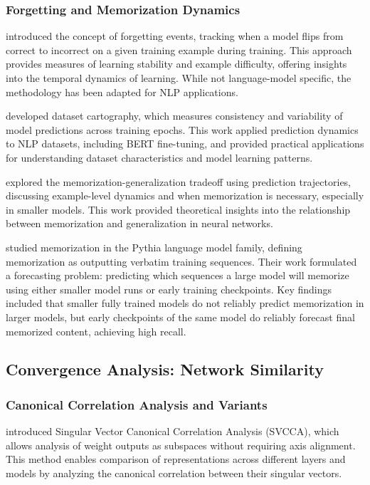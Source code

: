 \subsubsection{Forgetting and Memorization Dynamics}

\citet{toneva2019empirical} introduced the concept of forgetting events, tracking when a model flips from correct to incorrect on a given training example during training. This approach provides measures of learning stability and example difficulty, offering insights into the temporal dynamics of learning. While not language-model specific, the methodology has been adapted for NLP applications.

\citet{swayamdipta2020dataset} developed dataset cartography, which measures consistency and variability of model predictions across training epochs. This work applied prediction dynamics to NLP datasets, including BERT fine-tuning, and provided practical applications for understanding dataset characteristics and model learning patterns.

\citet{feldman2020does} explored the memorization-generalization tradeoff using prediction trajectories, discussing example-level dynamics and when memorization is necessary, especially in smaller models. This work provided theoretical insights into the relationship between memorization and generalization in neural networks.

\citet{biderman2023emergent} studied memorization in the Pythia language model family, defining memorization as outputting verbatim training sequences. Their work formulated a forecasting problem: predicting which sequences a large model will memorize using either smaller model runs or early training checkpoints. Key findings included that smaller fully trained models do not reliably predict memorization in larger models, but early checkpoints of the same model do reliably forecast final memorized content, achieving high recall.

\subsection{Convergence Analysis: Network Similarity}

\subsubsection{Canonical Correlation Analysis and Variants}

\citet{raghu2017svcca} introduced Singular Vector Canonical Correlation Analysis (SVCCA), which allows analysis of weight outputs as subspaces without requiring axis alignment. This method enables comparison of representations across different layers and models by analyzing the canonical correlation between their singular vectors.

